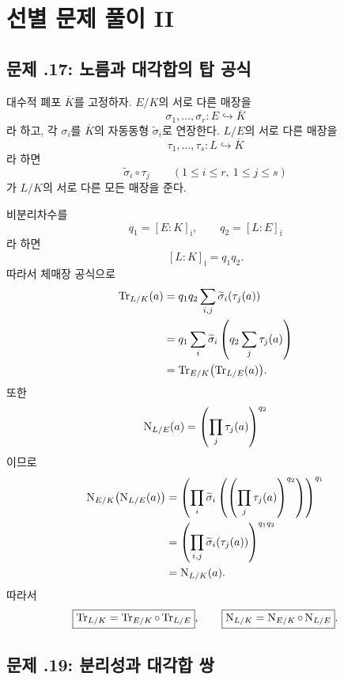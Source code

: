 \clearpage
\section{선별 문제 풀이 II}
\label{sec:norm-trace-solutions-b}

\subsection*{문제 \thechapter.17: 노름과 대각합의 탑 공식}

\begin{solution}
대수적 폐포 $\overline K$를 고정하자. $E/K$의 서로 다른 매장을
\[
  \sigma_1,\dots,\sigma_r:E\hookrightarrow\overline K
\]
라 하고, 각 $\sigma_i$를 $\overline K$의 자동동형
$\widetilde\sigma_i$로 연장한다. $L/E$의 서로 다른 매장을
\[
  \tau_1,\dots,\tau_s:L\hookrightarrow\overline K
\]
라 하면
\[
  \widetilde\sigma_i\circ\tau_j
  \qquad(1\le i\le r,\ 1\le j\le s)
\]
가 $L/K$의 서로 다른 모든 매장을 준다.

비분리차수를
\[
  q_1=[E:K]_{\mathrm i},
  \qquad
  q_2=[L:E]_{\mathrm i}
\]
라 하면
\[
  [L:K]_{\mathrm i}=q_1q_2.
\]
따라서 체매장 공식으로
\[
\begin{aligned}
  \operatorname{Tr}_{L/K}(a)
  &=q_1q_2\sum_{i,j}
    \widetilde\sigma_i(\tau_j(a))\\
  &=q_1\sum_i
    \widetilde\sigma_i
    \left(q_2\sum_j\tau_j(a)\right)\\
  &=\operatorname{Tr}_{E/K}\bigl(\operatorname{Tr}_{L/E}(a)\bigr).
\end{aligned}
\]
또한
\[
  \operatorname{N}_{L/E}(a)
  =\left(\prod_j\tau_j(a)\right)^{q_2}
\]
이므로
\[
\begin{aligned}
  \operatorname{N}_{E/K}\bigl(\operatorname{N}_{L/E}(a)\bigr)
  &=\left(
    \prod_i
    \widetilde\sigma_i
    \left(
      \left(\prod_j\tau_j(a)\right)^{q_2}
    \right)
    \right)^{q_1}\\
  &=\left(
    \prod_{i,j}
    \widetilde\sigma_i(\tau_j(a))
    \right)^{q_1q_2}\\
  &=\operatorname{N}_{L/K}(a).
\end{aligned}
\]
따라서
\[
  \boxed{
  \operatorname{Tr}_{L/K}
  =\operatorname{Tr}_{E/K}\circ\operatorname{Tr}_{L/E}},
  \qquad
  \boxed{
  \operatorname{N}_{L/K}
  =\operatorname{N}_{E/K}\circ\operatorname{N}_{L/E}}.
\]
\end{solution}

\subsection*{문제 \thechapter.19: 분리성과 대각합 쌍}

